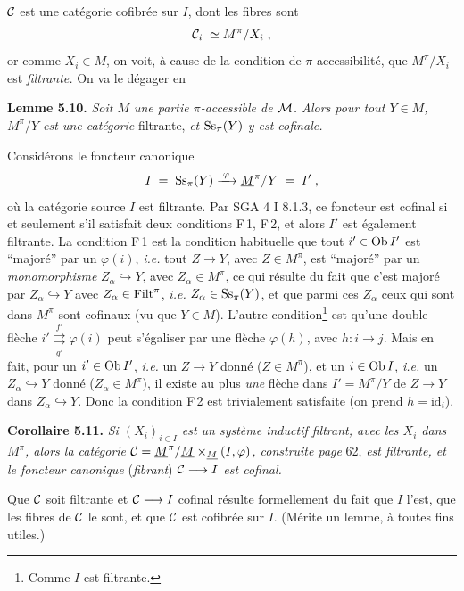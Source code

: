 $\mathcal{C}$ est une catégorie cofibrée sur $I$, dont les fibres sont
\[
\mathcal{C}_i \;\simeq M^\pi/X_i \;,
\]
or comme $X_i \in M$, on voit, à cause de la condition de $\pi$-accessibilité, que $M^\pi/X_i$ est \textit{filtrante.} On va le dégager en

\textbf{Lemme 5.10.} \textit{Soit $M$ une partie $\pi$-accessible de $\mathcal{M}$. Alors pour tout $Y \in M$, $M^\pi/Y$ est une catégorie} filtrante, \textit{et $\mathrm{Ss}_\pi(Y)$ y est cofinale.}


Considérons le foncteur canonique
\[
I \;=\; \mathrm{Ss}_\pi(Y) \xrightarrow{\;\varphi\;} \underline{M}^\pi/Y \;=\; I' \;,
\]
où la catégorie source $I$ est filtrante. Par SGA 4 I 8.1.3, ce foncteur est cofinal si et seulement s'il satisfait deux conditions F\,1, F\,2, et alors $I'$ est également filtrante. La condition F\,1 est la condition habituelle que tout $i' \in \operatorname{Ob} I'$ est “majoré” par un $\varphi(i)$, \textit{i.e.} tout $Z \longrightarrow Y$, avec $Z \in M^\pi$, est “majoré” par un \textit{monomorphisme} $Z_\alpha \hookrightarrow Y$, avec $Z_\alpha \in M^\pi$, ce qui résulte du fait que c'est majoré par $Z_\alpha \hookrightarrow Y$ avec $Z_\alpha \in \mathrm{Filt}^\pi$, \textit{i.e.} $Z_\alpha \in \mathrm{Ss}_\pi(Y)$, et que parmi ces $Z_\alpha$ ceux qui sont dans $M^\pi$ sont cofinaux (vu que $Y \in M$). L'autre condition\footnote[23]{Comme $I$ est filtrante.} est qu'une double flèche $i' \overset{f'}{\underset{g'}{\rightrightarrows}} \varphi(i)$ peut
s'égaliser par une flèche $\varphi(h)$, avec $h : i \longrightarrow j$. Mais en fait, pour un $i' \in \operatorname{Ob} I'$, \textit{i.e.} un $Z \longrightarrow Y$ donné ($Z \in M^\pi$), et un $i \in \operatorname{Ob} I$, \textit{i.e.} un $Z_\alpha \hookrightarrow Y$ donné ($Z_\alpha \in M^\pi$), il existe au plus \textit{une} flèche dans $I' = \underline{M}^\pi/Y$ de $Z \longrightarrow Y$ dans $Z_\alpha \hookrightarrow Y$. Donc la condition F\,2 est trivialement satisfaite (on prend $h = \mathrm{id}_i$).

\textbf{Corollaire 5.11.} \textit{Si $(X_i)_{i \in I}$ est un système inductif filtrant, avec les $X_i$ dans $M^\pi$, alors la catégorie $\mathcal{C} = \underline{M}^\pi/\underline{M} \times_{\underline{M}} (I,\varphi)$, construite page} 62, \textit{est filtrante, et le foncteur canonique} (\textit{fibrant}) \textit{$\mathcal{C} \longrightarrow I$ est cofinal.}

Que $\mathcal{C}$ soit filtrante et $\mathcal{C} \longrightarrow I$ cofinal résulte formellement du fait que $I$ l'est, que les fibres de $\mathcal{C}$ le sont, et que $\mathcal{C}$ est cofibrée sur $I$. (Mérite un lemme, à toutes fins utiles.)

